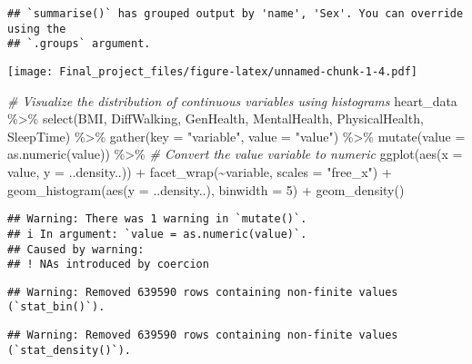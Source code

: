 \documentclass[
]{article}
\newenvironment{Shaded}{\begin{snugshade}}{\end{snugshade}}
\newcommand{\AttributeTok}[1]{\textcolor[rgb]{0.77,0.63,0.00}{#1}}
\newcommand{\CommentTok}[1]{\textcolor[rgb]{0.56,0.35,0.01}{\textit{#1}}}
\newcommand{\DecValTok}[1]{\textcolor[rgb]{0.00,0.00,0.81}{#1}}
\newcommand{\FunctionTok}[1]{\textcolor[rgb]{0.00,0.00,0.00}{#1}}
\newcommand{\NormalTok}[1]{#1}
\newcommand{\SpecialCharTok}[1]{\textcolor[rgb]{0.00,0.00,0.00}{#1}}
\newcommand{\StringTok}[1]{\textcolor[rgb]{0.31,0.60,0.02}{#1}}
\begin{document}
\begin{verbatim}
## `summarise()` has grouped output by 'name', 'Sex'. You can override using the
## `.groups` argument.
\end{verbatim}

\texttt{[image: Final\_project\_files/figure-latex/unnamed-chunk-1-4.pdf]}

\begin{Shaded}
\begin{Highlighting}[]
\CommentTok{\# Visualize the distribution of continuous variables using histograms}
\NormalTok{heart\_data }\SpecialCharTok{\%\textgreater{}\%} 
  \FunctionTok{select}\NormalTok{(BMI, DiffWalking, GenHealth, MentalHealth, PhysicalHealth, SleepTime) }\SpecialCharTok{\%\textgreater{}\%} 
  \FunctionTok{gather}\NormalTok{(}\AttributeTok{key =} \StringTok{"variable"}\NormalTok{, }\AttributeTok{value =} \StringTok{"value"}\NormalTok{) }\SpecialCharTok{\%\textgreater{}\%} 
  \FunctionTok{mutate}\NormalTok{(}\AttributeTok{value =} \FunctionTok{as.numeric}\NormalTok{(value)) }\SpecialCharTok{\%\textgreater{}\%} \CommentTok{\# Convert the value variable to numeric}
  \FunctionTok{ggplot}\NormalTok{(}\FunctionTok{aes}\NormalTok{(}\AttributeTok{x =}\NormalTok{ value, }\AttributeTok{y =}\NormalTok{ ..density..)) }\SpecialCharTok{+}
  \FunctionTok{facet\_wrap}\NormalTok{(}\SpecialCharTok{\textasciitilde{}}\NormalTok{variable, }\AttributeTok{scales =} \StringTok{"free\_x"}\NormalTok{) }\SpecialCharTok{+}
  \FunctionTok{geom\_histogram}\NormalTok{(}\FunctionTok{aes}\NormalTok{(}\AttributeTok{y =}\NormalTok{ ..density..), }\AttributeTok{binwidth =} \DecValTok{5}\NormalTok{) }\SpecialCharTok{+}
  \FunctionTok{geom\_density}\NormalTok{()}
\end{Highlighting}
\end{Shaded}

\begin{verbatim}
## Warning: There was 1 warning in `mutate()`.
## i In argument: `value = as.numeric(value)`.
## Caused by warning:
## ! NAs introduced by coercion
\end{verbatim}

\begin{verbatim}
## Warning: Removed 639590 rows containing non-finite values (`stat_bin()`).
\end{verbatim}

\begin{verbatim}
## Warning: Removed 639590 rows containing non-finite values (`stat_density()`).
\end{verbatim}
\end{document}
